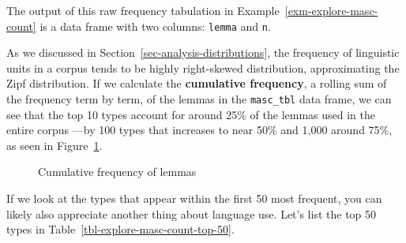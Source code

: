 \documentclass[
  letterpaper,
  krantz1]{latex/krantz-mod}
\theoremstyle{definition}
\theoremstyle{definition}
\theoremstyle{remark}
\begin{document}
The output of this raw frequency tabulation in
Example~\ref{exm-explore-masc-count} is a data frame with two columns:
\texttt{lemma} and \texttt{n}.

As we discussed in Section~\ref{sec-analysis-distributions}, the
frequency of linguistic units in a corpus tends to be highly
right-skewed distribution, approximating the
Zipf distribution. If we calculate the
\textbf{cumulative frequency}, a rolling sum
of the frequency term by term, of the lemmas in the \texttt{masc\_tbl}
data frame, we can see that the top 10 types account for around 25\% of
the lemmas used in the entire corpus ---by 100 types that increases to
near 50\% and 1,000 around 75\%, as seen in
Figure~\ref{fig-explore-masc-count-cumulative}.

\begin{figure}[!htb]


\caption{\label{fig-explore-masc-count-cumulative}Cumulative frequency
of lemmas}

\end{figure}%

If we look at the types that appear within the first 50 most frequent,
you can likely also appreciate another thing about language use. Let's
list the top 50 types in Table~\ref{tbl-explore-masc-count-top-50}.
\end{document}
